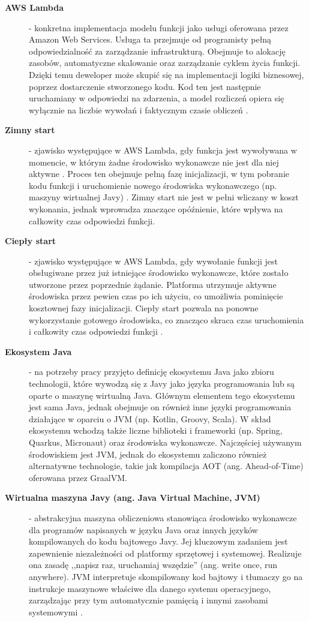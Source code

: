 \begin{description}
    \item[\textbf{AWS Lambda}] - konkretna implementacja modelu funkcji jako usługi oferowana przez Amazon Web Services. Usługa ta przejmuje od programisty pełną odpowiedzialność za zarządzanie infrastrukturą. Obejmuje to alokację zasobów, automatyczne skalowanie oraz zarządzanie cyklem życia funkcji. Dzięki temu deweloper może skupić się na implementacji logiki biznesowej, poprzez dostarczenie stworzonego kodu. Kod ten jest następnie uruchamiany w odpowiedzi na zdarzenia, a model rozliczeń opiera się wyłącznie na liczbie wywołań i faktycznym czasie obliczeń \cite{awsLambdaDocs}.

    \item[\textbf{Zimny start}] - zjawisko występujące w AWS Lambda, gdy funkcja jest wywoływana w momencie, w którym żadne środowisko wykonawcze nie jest dla niej aktywne \cite{awsLambdaDocs}. Proces ten obejmuje pełną fazę inicjalizacji, w tym pobranie kodu funkcji i uruchomienie nowego środowiska wykonawczego (np. maszyny wirtualnej Javy) \cite{awsLambdaDocs}. Zimny start nie jest w pełni wliczany w koszt wykonania, jednak wprowadza znaczące opóźnienie, które wpływa na całkowity czas odpowiedzi funkcji.

    \item[\textbf{Ciepły start}] - zjawisko występujące w AWS Lambda, gdy wywołanie funkcji jest obsługiwane przez już istniejące środowisko wykonawcze, które zostało utworzone przez poprzednie żądanie. Platforma utrzymuje aktywne środowiska przez pewien czas po ich użyciu, co umożliwia pominięcie kosztownej fazy inicjalizacji. Ciepły start pozwala na ponowne wykorzystanie gotowego środowiska, co znacząco skraca czas uruchomienia i całkowity czas odpowiedzi funkcji \cite{awsLambdaDocs}.

    \item[\textbf{Ekosystem Java}] - na potrzeby pracy przyjęto definicję ekosystemu Java jako zbioru technologii, które wywodzą się z Javy jako języka programowania lub są oparte o maszynę wirtualną Java. Głównym elementem tego ekosystemu jest sama Java, jednak obejmuje on również inne języki programowania działające w oparciu o JVM (np. Kotlin, Groovy, Scala). W skład ekosystemu wchodzą także liczne biblioteki i frameworki (np. Spring, Quarkus, Micronaut) oraz środowiska wykonawcze. Najczęściej używanym środowiskiem jest JVM, jednak do ekosystemu zaliczono również alternatywne technologie, takie jak kompilacja AOT (ang. Ahead-of-Time) oferowana przez GraalVM.

    \item[\textbf{Wirtualna maszyna Javy (ang. Java Virtual Machine, JVM)}] - abstrakcyjna maszyna obliczeniowa stanowiąca środowisko wykonawcze dla programów napisanych w języku Java oraz innych języków kompilowanych do kodu bajtowego Javy. Jej kluczowym zadaniem jest zapewnienie niezależności od platformy sprzętowej i systemowej. Realizuje ona zasadę ,,napisz raz, uruchamiaj wszędzie'' (ang. write once, run anywhere). JVM interpretuje skompilowany kod bajtowy i tłumaczy go na instrukcje maszynowe właściwe dla danego systemu operacyjnego, zarządzając przy tym automatycznie pamięcią i innymi zasobami systemowymi \cite{oracle_jvm_spec}.


\end{description}
